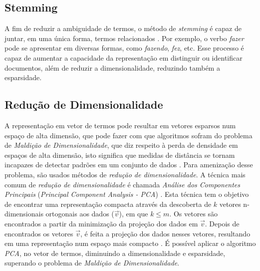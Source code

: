 \documentclass[
    12pt,                %
    oneside,            %
    a4paper,            %
    english,            %
    brazil                %
    ]{abntex2ppgsi}
\begin{document}

\subsection{Stemming}

A fim de reduzir a ambiguidade de termos, o método de \textit{stemming} é capaz de juntar, em uma única forma, termos relacionados \cite{Miner2012}. Por exemplo, o verbo \textit{fazer} pode se apresentar em diversas formas, como \textit{fazendo}, \textit{fez}, etc. Esse processo é capaz de aumentar a capacidade da representação em distinguir ou identificar documentos, além de reduzir a dimensionalidade, reduzindo também a esparsidade.

\subsection{Redução de Dimensionalidade}

A representação em vetor de termos pode resultar em vetores esparsos num espaço de alta dimensão, que pode fazer com que algoritmos sofram do problema de \textit{Maldição de Dimensionalidade}, que diz respeito à perda de densidade em espaços de alta dimensão, isto significa que medidas de distância se tornam incapazes de detectar padrões em um conjunto de dados \cite{Haykin2008}.
Para amenização desse problema, são usados métodos de \textit{redução de dimensionalidade}.
A técnica mais comum de \textit{redução de dimensionalidade} é chamada \textit{Análise dos Componentes Principais} (\textit{Principal Component Analysis - PCA}) \cite{Murphy2012}.
Esta técnica tem o objetivo de encontrar uma representação compacta através da descoberta de $k$ vetores n-dimensionais ortogonais aos dados ($\vec{v}$), em que $k \leq m$. Os vetores são encontrados a partir da minimização da projeção dos dados em $\vec{v}$.
Depois de encontrados os vetores $\vec{v}$, é feita a projeção dos dados nesses vetores, resultando em uma representação num espaço mais compacto \cite{Kamber2011}.
É possível aplicar o algoritmo \textit{PCA}, no vetor de termos, diminuindo a dimensionalidade e esparsidade, superando o problema de \textit{Maldição de Dimensionalidade}.

\end{document}
